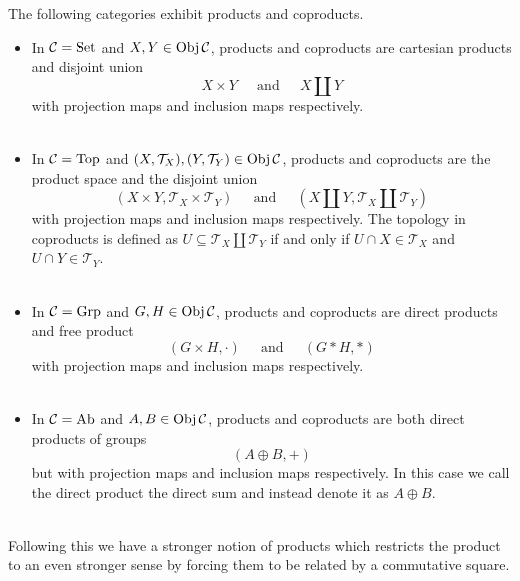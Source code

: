 \documentclass[a4paper]{article}
\begin{document}
\begin{prp}{}{} The following categories exhibit products and coproducts. 
\begin{itemize}
\item In $\mathcal{C}=\text{Set}$ and $X,Y\in\operatorname{Obj}\mathcal{C}$, products and coproducts are cartesian products and disjoint union $$X\times Y\;\;\;\;\text{ and }\;\;\;\; X\amalg Y$$ with projection maps and inclusion maps respectively. \\~\\

\item In $\mathcal{C}=\text{Top}$ and $(X,\mathcal{T}_X),(Y,\mathcal{T}_Y)\in\operatorname{Obj}\mathcal{C}$, products and coproducts are the product space and the disjoint union $$(X\times Y,\mathcal{T}_X\times\mathcal{T}_Y)\;\;\;\;\text{ and }\;\;\;\;(X\amalg Y,\mathcal{T}_X\amalg\mathcal{T}_Y)$$ with projection maps and inclusion maps respectively. The topology in coproducts is defined as $U\subseteq\mathcal{T}_X\amalg\mathcal{T}_Y$ if and only if $U\cap X\in\mathcal{T}_X$ and $U\cap Y\in\mathcal{T}_Y$. \\~\\

\item In $\mathcal{C}=\text{Grp}$ and $G,H\in\operatorname{Obj}\mathcal{C}$, products and coproducts are direct products and free product $$(G\times H,\cdot)\;\;\;\;\text{ and }\;\;\;\;(G\ast H,\ast)$$ with projection maps and inclusion maps respectively. \\~\\

\item In $\mathcal{C}=\text{Ab}$ and $A,B\in\operatorname{Obj}\mathcal{C}$, products and coproducts are both direct products of groups $$(A\oplus B,+)$$ but with projection maps and inclusion maps respectively. In this case we call the direct product the direct sum and instead denote it as $A\oplus B$. \\~\\
\end{itemize}
\end{prp}

Following this we have a stronger notion of products which restricts the product to an even stronger sense by forcing them to be related by a commutative square. 
\end{document}
